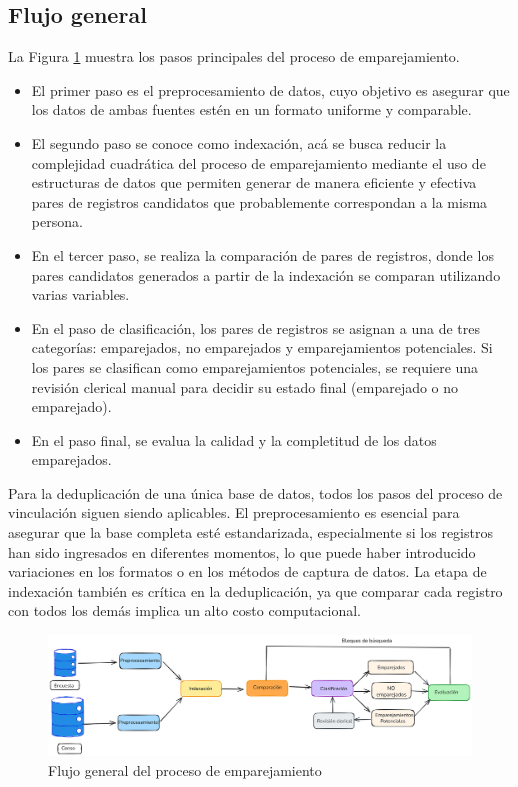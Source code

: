 \documentclass[
  12pt,
]{book}
\providecommand{\tightlist}{%
  \setlength{\itemsep}{0pt}\setlength{\parskip}{0pt}}
\begin{document}
\subsection{Flujo general}\label{flujo-general}

La Figura \ref{fig:match1} muestra los pasos principales del proceso de emparejamiento.

\begin{itemize}
\tightlist
\item
  El primer paso es el preprocesamiento de datos, cuyo objetivo es asegurar que los datos de ambas fuentes estén en un formato uniforme y comparable.
\item
  El segundo paso se conoce como indexación, acá se busca reducir la complejidad cuadrática del proceso de emparejamiento mediante el uso de estructuras de datos que permiten generar de manera eficiente y efectiva pares de registros candidatos que probablemente correspondan a la misma persona.
\item
  En el tercer paso, se realiza la comparación de pares de registros, donde los pares candidatos generados a partir de la indexación se comparan utilizando varias variables.
\item
  En el paso de clasificación, los pares de registros se asignan a una de tres categorías: emparejados, no emparejados y emparejamientos potenciales. Si los pares se clasifican como emparejamientos potenciales, se requiere una revisión clerical manual para decidir su estado final (emparejado o no emparejado).
\item
  En el paso final, se evalua la calidad y la completitud de los datos emparejados.
\end{itemize}

Para la deduplicación de una única base de datos, todos los pasos del proceso de vinculación siguen siendo aplicables. El preprocesamiento es esencial para asegurar que la base completa esté estandarizada, especialmente si los registros han sido ingresados en diferentes momentos, lo que puede haber introducido variaciones en los formatos o en los métodos de captura de datos. La etapa de indexación también es crítica en la deduplicación, ya que comparar cada registro con todos los demás implica un alto costo computacional.

\begin{figure}

{\centering \includegraphics[width=1\linewidth]{images/FlujoMatch2} 

}

\caption{Flujo general del proceso de emparejamiento}\label{fig:match1}
\end{figure}
\end{document}

